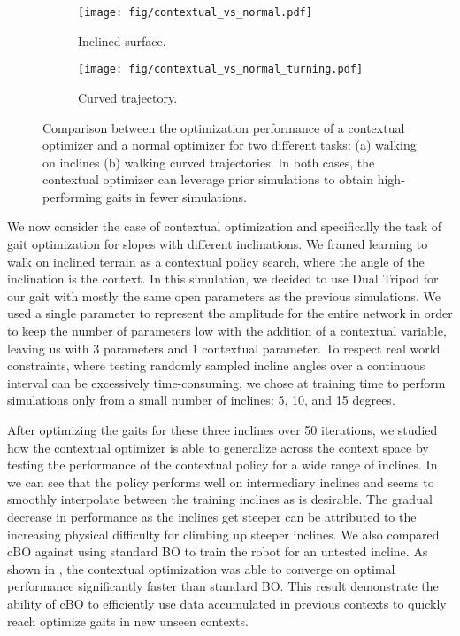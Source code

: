 	\begin{figure}[t]
	  \centering
	  	\begin{subfigure}{0.49\linewidth}
      \centering
	  \texttt{[image: fig/contextual\_vs\_normal.pdf]}
	  \caption{Inclined surface.}
	  \label{fig:contextual:1}
	\end{subfigure}
\hfill
	\begin{subfigure}{0.49\linewidth}
	  \centering
	  \texttt{[image: fig/contextual\_vs\_normal\_turning.pdf]}
	  \caption{Curved trajectory.}
	  \label{fig:contextual:2}
	  	\end{subfigure}
\caption{Comparison between the optimization performance of a contextual optimizer and a normal optimizer for two different tasks: (a) walking on inclines (b) walking curved trajectories. In both cases, the contextual optimizer can leverage prior simulations to obtain high-performing gaits in fewer simulations.}
	   \vspace{-10pt}
       \end{figure}
       
	We now consider the case of contextual optimization and specifically the task of gait optimization for slopes with different inclinations.
	We framed learning to walk on inclined terrain as a contextual policy search, where the angle of the inclination is the context. 
	In this simulation, we decided to use Dual Tripod for our gait with mostly the same open parameters as the previous simulations.
    We used a single parameter to represent the amplitude for the entire network in order to keep the number of parameters low with the addition of a contextual variable, leaving us with 3 parameters and 1 contextual parameter.
	To respect real world constraints, where testing randomly sampled incline angles over a continuous interval can be excessively time-consuming, we chose at training time to perform simulations only from a small number of inclines: 5, 10, and 15 degrees.
	
	After optimizing the gaits for these three inclines over 50 iterations, we studied how the contextual optimizer is able to generalize across the context space by testing the performance of the contextual policy for a wide range of inclines.
	In  we can see that the policy performs well on intermediary inclines and seems to smoothly interpolate between the training inclines as is desirable.
	The gradual decrease in performance as the inclines get steeper can be attributed to the increasing physical difficulty for climbing up steeper inclines.
	We also compared cBO against using standard BO to train the robot for an untested incline. 
	As shown in , the contextual optimization was able to converge on optimal performance significantly faster than standard BO.
	This result demonstrate the ability of cBO to efficiently use data accumulated in previous contexts to quickly reach optimize gaits in new unseen contexts.

